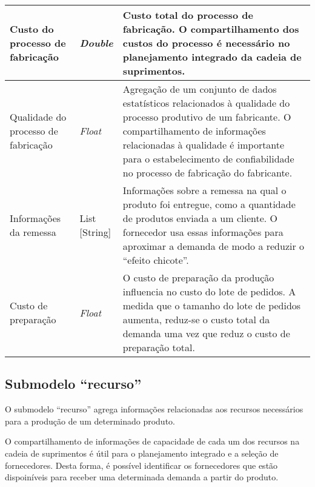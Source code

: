 \begin{table}[htb]
\begin{tabular}{p{3.5cm}p{1.5cm}p{9cm}}
		\hline
		Custo do processo de fabricação
		 & \textit{Double}
		 & Custo total do processo de fabricação. O compartilhamento dos custos do processo é necessário no planejamento integrado da cadeia de suprimentos.                                                                                                                                         \\

		\hline
		Qualidade do processo de fabricação
		 & \textit{Float}
		 & Agregação de um conjunto de dados estatísticos relacionados à qualidade do processo produtivo de um fabricante. O compartilhamento de informações relacionadas à qualidade é importante para o estabelecimento de confiabilidade no processo de fabricação do fabricante.                 \\

		\hline
		Informações da remessa
		 & \makecell{List\\{[String]}}
		 & Informações sobre a remessa na qual o produto foi entregue, como a quantidade de produtos enviada a um cliente. O fornecedor usa essas informações para aproximar a demanda de modo a reduzir o ``efeito chicote''.                                                                       \\

		\hline
		Custo de preparação
		 & \textit{Float}
		 & O custo de preparação da produção influencia no custo do lote de pedidos. A medida que o tamanho do lote de pedidos aumenta, reduz-se o custo total da demanda uma vez que reduz o custo de preparação total.                                                                             \\

		\hline
	\end{tabular}
	\label{tab:produto-submodelo-processo}
\end{table}

\subsection{Submodelo ``recurso''}

O submodelo ``recurso'' agrega informações relacionadas aos recursos necessários para a produção de um determinado produto.

O compartilhamento de informações de capacidade de cada um dos recursos na cadeia de suprimentos é útil para o planejamento integrado e a seleção de fornecedores. Desta forma, é possível identificar os fornecedores que estão dispoiníveis para receber uma determinada demanda a partir do produto.


